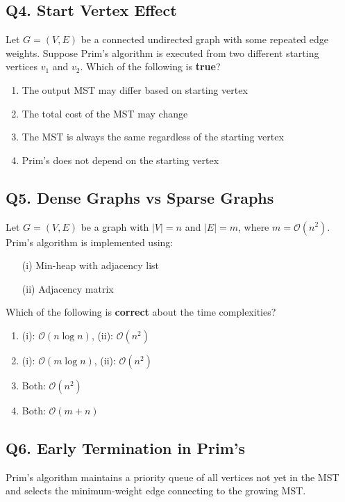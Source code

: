 \subsection*{Q4. Start Vertex Effect}
Let $G = (V, E)$ be a connected undirected graph with some repeated edge\\
weights. Suppose Prim's algorithm is executed from two different starting\\
vertices $v_1$ and $v_2$. Which of the following is \textbf{true}?

\begin{enumerate}[label=(\alph*)]
    \item The output MST may differ based on starting vertex
    \item The total cost of the MST may change
    \item The MST is always the same regardless of the starting vertex
    \item Prim's does not depend on the starting vertex
\end{enumerate}

\newpage
\subsection*{Q5. Dense Graphs vs Sparse Graphs}
Let $G = (V, E)$ be a graph with $|V| = n$ and $|E| = m$, where $m = \mathcal{O}(n^2)$. Prim's algorithm is implemented using:

\begin{itemize}
    \item[(i)] Min-heap with adjacency list
    \item[(ii)] Adjacency matrix
\end{itemize}

Which of the following is \textbf{correct} about the time complexities?

\begin{enumerate}[label=(\alph*)]
    \item (i): $\mathcal{O}(n \log n)$, (ii): $\mathcal{O}(n^2)$
    \item (i): $\mathcal{O}(m \log n)$, (ii): $\mathcal{O}(n^2)$
    \item Both: $\mathcal{O}(n^2)$
    \item Both: $\mathcal{O}(m + n)$
\end{enumerate}

\subsection*{Q6. Early Termination in Prim's}
Prim's algorithm maintains a priority queue of all vertices not yet in the MST and selects the minimum-weight edge connecting to the growing MST.

